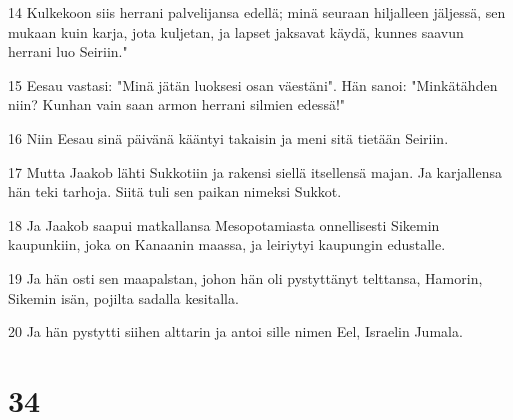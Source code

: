 \par 14 Kulkekoon siis herrani palvelijansa edellä; minä seuraan hiljalleen jäljessä, sen mukaan kuin karja, jota kuljetan, ja lapset jaksavat käydä, kunnes saavun herrani luo Seiriin."
\par 15 Eesau vastasi: "Minä jätän luoksesi osan väestäni". Hän sanoi: "Minkätähden niin? Kunhan vain saan armon herrani silmien edessä!"
\par 16 Niin Eesau sinä päivänä kääntyi takaisin ja meni sitä tietään Seiriin.
\par 17 Mutta Jaakob lähti Sukkotiin ja rakensi siellä itsellensä majan. Ja karjallensa hän teki tarhoja. Siitä tuli sen paikan nimeksi Sukkot.
\par 18 Ja Jaakob saapui matkallansa Mesopotamiasta onnellisesti Sikemin kaupunkiin, joka on Kanaanin maassa, ja leiriytyi kaupungin edustalle.
\par 19 Ja hän osti sen maapalstan, johon hän oli pystyttänyt telttansa, Hamorin, Sikemin isän, pojilta sadalla kesitalla.
\par 20 Ja hän pystytti siihen alttarin ja antoi sille nimen Eel, Israelin Jumala.

\chapter{34}

